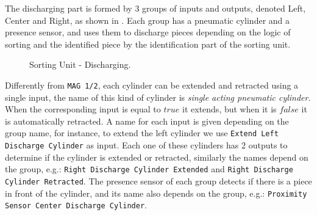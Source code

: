 The discharging part is formed by 3 groups of inputs and outputs, denoted Left, Center and
Right, as shown in . 
Each group has a pneumatic cylinder and a presence sensor, and uses them to discharge pieces
depending on the logic of sorting and the identified piece by the identification
part of the sorting unit.
\begin{figure}[H]
  \centering
  \caption{Sorting Unit - Discharging.}
  \label{fig:sortDisc}
\end{figure}
Differently from \verb|MAG 1/2|, each cylinder can be extended and retracted
using a single input, the name of this kind of cylinder is \emph{
single acting pneumatic cylinder}. When the corresponding input is equal to $true$ it
extends, but when it is $false$ it is automatically retracted.
A name for each input is given depending on the group name, for
instance, to extend the left cylinder we use
\verb|Extend Left Discharge Cylinder| as input.
Each one of these cylinders has 2 outputs to determine if the cylinder is
extended or retracted, similarly the names depend on the group, e.g.:
\verb|Right Discharge Cylinder Extended| and
\verb|Right Discharge Cylinder Retracted|.
The presence sensor of each group detects if there is a piece in front of the
cylinder, and its name also depends on the group, e.g.:
\verb|Proximity Sensor Center Discharge Cylinder|.

